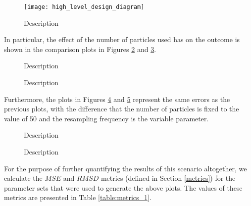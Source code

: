 \begin{figure}
    \centering
    \texttt{[image: high\_level\_design\_diagram]}
    \caption[Name]{
        Description
    }
    \label{fig:bird_1}
\end{figure}

In particular, the effect of the number of particles used has on
the outcome is shown in the comparison plots in Figures
\ref{fig:mean_error_vs_particles_1} and \ref{fig:std_error_vs_particles_1}.

\begin{figure}
    \centering
    
    \caption[Name]{
        Description
    }
    \label{fig:mean_error_vs_particles_1}
\end{figure}

\begin{figure}
    \centering
    
    \caption[Name]{
        Description
    }
    \label{fig:std_error_vs_particles_1}
\end{figure}

Furthermore, the plots in Figures \ref{fig:mean_error_vs_resampling_1} and
\ref{fig:std_error_vs_resampling_1} represent the same errors as the previous
plots, with the difference that the number of particles is fixed to the
value of 50 and the resampling frequency is the variable parameter.

\begin{figure}
    \centering
    
    \caption[Name]{
        Description
    }
    \label{fig:mean_error_vs_resampling_1}
\end{figure}

\begin{figure}
    \centering
    
    \caption[Name]{
        Description
    }
    \label{fig:std_error_vs_resampling_1}
\end{figure}

For the purpose of further quantifying the results of this scenario altogether,
we calculate the $MSE$ and $RMSD$ metrics (defined in Section \ref{metrics})
for the parameter sets that were used to generate the above plots.
The values of these metrics are presented in Table \ref{table:metrics_1}.

